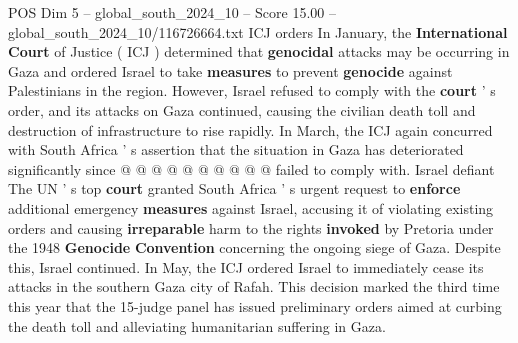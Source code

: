 \begin{textsample}{POS Dim 5 – global\_south\_2024\_10 – Score 15.00 – global\_south\_2024\_10/116726664.txt}
ICJ orders In January, the \textbf{International} \textbf{Court} of Justice ( ICJ ) determined that \textbf{genocidal} attacks may be occurring in Gaza and ordered Israel to take \textbf{measures} to prevent \textbf{genocide} against Palestinians in the region.
However, Israel refused to comply with the \textbf{court} ' s order, and its attacks on Gaza continued, causing the civilian death toll and destruction of infrastructure to rise rapidly.
In March, the ICJ again concurred with South Africa ' s assertion that the situation in Gaza has deteriorated significantly since @ @ @ @ @ @ @ @ @ @ failed to comply with.
Israel defiant The UN ' s top \textbf{court} granted South Africa ' s urgent request to \textbf{enforce} additional emergency \textbf{measures} against Israel, accusing it of violating existing orders and causing \textbf{irreparable} harm to the rights \textbf{invoked} by Pretoria under the 1948 \textbf{Genocide} \textbf{Convention} concerning the ongoing siege of Gaza.
Despite this, Israel continued.
In May, the ICJ ordered Israel to immediately cease its attacks in the southern Gaza city of Rafah.
This decision marked the third time this year that the 15-judge panel has issued preliminary orders aimed at curbing the death toll and alleviating humanitarian suffering in Gaza.

\end{textsample}
